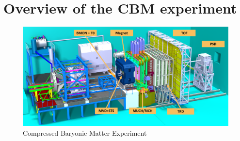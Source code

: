 \section{Overview of the CBM experiment}
\begin{figure}[!h]
    \centering
    \includegraphics[width=0.95\columnwidth]{Chapter1/images/CBMnew.png}
    \caption{Compressed Baryonic Matter Experiment}
    \label{fig:exp}
\end{figure}
